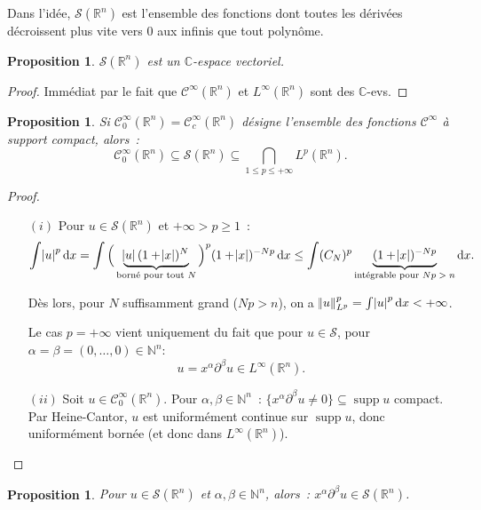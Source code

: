 \documentclass{report}
\DeclareMathOperator{\supp}{supp}
\newcommand{\C}{{\mathbb C}}
\newcommand{\R}{{\mathbb R}}
\newcommand{\N}{{\mathbb N}}
\newcommand{\pinfty}{{+\infty}}
\newtheorem{prp}[thm]{Proposition}
\theoremstyle{definition}
\theoremstyle{remark}
\begin{document}
Dans l'idée, $\mathcal S(\R^n)$ est l'ensemble des fonctions dont toutes les dérivées décroissent plus vite vers 0 aux infinis que tout polynôme.

\begin{prp} $\mathcal S(\R^n)$ est un $\C$-espace vectoriel.
\end{prp}

\begin{proof} Immédiat par le fait que $\mathcal C^\infty(\R^n)$ et $L^\infty(\R^n)$ sont des $\C$-evs.
\end{proof}

\begin{prp}\label{prp:C^infty_0 dans Schartz dans l'intersection des L^p} Si $\mathcal C^\infty_0(\R^n) = \mathcal C^\infty_c(\R^n)$ désigne l'ensemble des fonctions $\mathcal C^\infty$ à support compact, alors~:
\[\mathcal C^\infty_0(\R^n) \subseteq \mathcal S(\R^n) \subseteq \bigcap_{1 \leq p \leq \pinfty} L^p(\R^n).\]
\end{prp}

\begin{proof}~
\begin{itemize}
	\item[$(i)$] Pour $u \in \mathcal S(\R^n)$ et $\pinfty > p \geq 1$~:
	\[\int \abs u^p\dif x = \int \Big(\underbrace{\abs u(1+\abs x)^N}_{\text{borné pour tout $N$}}\Big)^p(1+\abs x)^{-Np}\dif x
		\leq \int (C_N)^p\underbrace {(1+\abs x)^{-Np}}_{\text{intégrable pour $Np > n$}}\dif x.\]

	Dès lors, pour $N$ suffisamment grand ($Np>n$), on a $\norm u^p_{L^p} = \int \abs u^p\dif x < \pinfty$.

	Le cas $p = \pinfty$ vient uniquement du fait que pour $u \in \mathcal S$, pour $\alpha = \beta = (0, \ldots, 0) \in \N^n$:
	\[u = x^\alpha\partial^\beta u \in L^\infty(\R^n).\]

	\item[$(ii)$] Soit $u \in \mathcal C^\infty_0(\R^n)$. Pour $\alpha, \beta \in \N^n$~: $\{x^\alpha\partial^\beta u \neq 0\} \subseteq \supp u$ compact. Par Heine-Cantor,
	$u$ est uniformément continue sur $\supp u$, donc uniformément bornée (et donc dans $L^\infty(\R^n)$).
\end{itemize}
\end{proof}

\begin{prp} Pour $u \in \mathcal S(\R^n)$ et $\alpha, \beta \in \N^n$, alors~: $x^\alpha\partial^\beta u \in \mathcal S(\R^n)$.
\end{prp}
\end{document}
